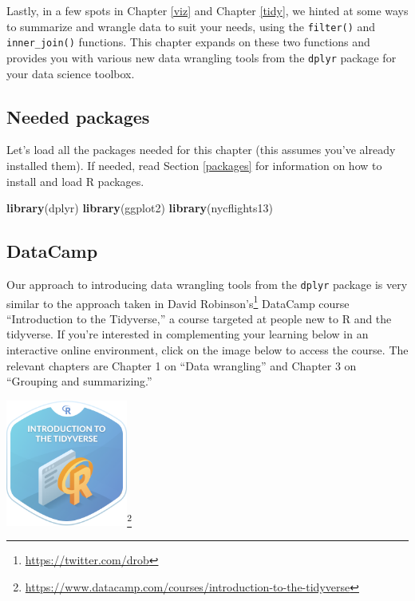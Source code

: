 \documentclass[12pt,]{krantz}
\makeatletter
\newenvironment{Shaded}{\begin{snugshade}}{\end{snugshade}}
\newcommand{\KeywordTok}[1]{\textcolor[rgb]{0.27,0.27,0.27}{\textbf{#1}}}
\newcommand{\NormalTok}[1]{#1}
\renewcommand{\href}[2]{#2\footnote{\url{#1}}}
\newenvironment{kframe}{%
\medskip{}
\setlength{\fboxsep}{.8em}
 \def\at@end@of@kframe{}%
 \ifinner\ifhmode%
  \def\at@end@of@kframe{\end{minipage}}%
  \begin{minipage}{\columnwidth}%
 \fi\fi%
 \def\FrameCommand##1{\hskip\@totalleftmargin \hskip-\fboxsep
 \colorbox{shadecolor}{##1}\hskip-\fboxsep
     \hskip-\linewidth \hskip-\@totalleftmargin \hskip\columnwidth}%
 \MakeFramed {\advance\hsize-\width
   \@totalleftmargin\z@ \linewidth\hsize
   \@setminipage}}%
 {\par\unskip\endMakeFramed%
 \at@end@of@kframe}
\renewenvironment{Shaded}{\begin{kframe}}{\end{kframe}}
\makeatother
\begin{document}
Lastly, in a few spots in Chapter \ref{viz} and Chapter \ref{tidy}, we
hinted at some ways to summarize and wrangle data to suit your needs,
using the \texttt{filter()} and \texttt{inner\_join()} functions. This
chapter expands on these two functions and provides you with various new
data wrangling tools from the \texttt{dplyr} package \citep{R-dplyr} for
your data science toolbox.

\subsection*{Needed packages}\label{needed-packages-2}


Let's load all the packages needed for this chapter (this assumes you've
already installed them). If needed, read Section \ref{packages} for
information on how to install and load R packages.

\begin{Shaded}
\begin{Highlighting}[]
\KeywordTok{library}\NormalTok{(dplyr)}
\KeywordTok{library}\NormalTok{(ggplot2)}
\KeywordTok{library}\NormalTok{(nycflights13)}
\end{Highlighting}
\end{Shaded}

\subsection*{DataCamp}\label{datacamp-2}


Our approach to introducing data wrangling tools from the \texttt{dplyr}
package is very similar to the approach taken in
\href{https://twitter.com/drob}{David Robinson's} DataCamp course
``Introduction to the Tidyverse,'' a course targeted at people new to R
and the tidyverse. If you're interested in complementing your learning
below in an interactive online environment, click on the image below to
access the course. The relevant chapters are Chapter 1 on ``Data
wrangling'' and Chapter 3 on ``Grouping and summarizing.''

\begin{center}
\href{https://www.datacamp.com/courses/introduction-to-the-tidyverse}{\includegraphics[width=0.3\textwidth]{images/datacamp_intro_to_tidyverse.png}}
\end{center}
\end{document}
